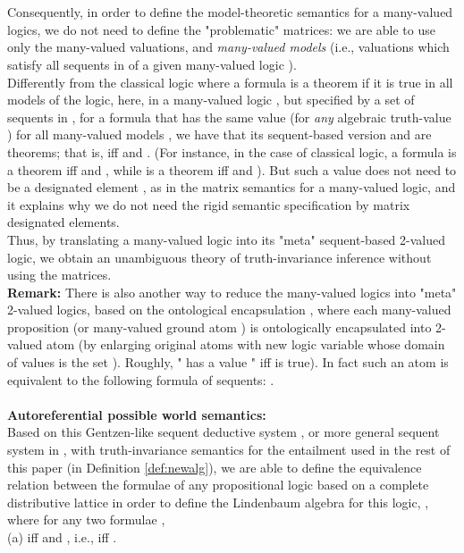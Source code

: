 \documentclass[10pt,twocolumn]{article}
\begin{document}
 \\\\
Consequently, in order to define the model-theoretic semantics for a
many-valued logics, we do not need to define the "problematic"
matrices: we are able to use only the many-valued valuations, and
\emph{many-valued models} (i.e., valuations which satisfy all
sequents in  of
a given many-valued logic ).\\
Differently from the classical logic where a formula is a theorem if
it is true in all models of the logic, here, in  a many-valued logic
, but specified by a set of sequents in , for a formula
 that has the same value  (for \emph{any}
algebraic truth-value ) for all many-valued models , we have that its sequent-based version  and  are theorems; that is,  iff  and . (For instance, in
the case of classical logic, a formula  is a theorem iff
 and , while  is a theorem iff  and ). But such a value
 does not need to be a designated element , as in
the matrix semantics for a many-valued logic, and it explains why we
do not need the rigid semantic specification by matrix designated
elements.\\ Thus, by  translating  a many-valued logic  into its
"meta" sequent-based 2-valued logic, we obtain an unambiguous theory
of truth-invariance inference without using the matrices.
\\
\textbf{Remark:} There is also another way to reduce the many-valued
logics into "meta" 2-valued logics, based on the ontological
encapsulation \cite{Majk04on}, where each many-valued proposition
(or many-valued ground atom ) is ontologically
encapsulated into 2-valued atom  (by enlarging
original atoms with new logic variable  whose domain of values is
the set ). Roughly, " has a value " iff
 is true).
 In fact such an atom is equivalent to the following formula of
 sequents:
 .
 \\\\
\textbf{Autoreferential possible world semantics:}\\
 Based on
this Gentzen-like sequent deductive system , or more general
sequent system in \cite{Majk09BS}, with truth-invariance semantics
for the entailment used in the rest of this paper (in Definition
\ref{def:newalg}), we are able to
 define the equivalence relation  between the formulae of any
 propositional logic based on a  complete distributive lattice   in order to
 define the Lindenbaum algebra for this logic, ,
 where for any two formulae ,\\ (a) iff  and , i.e., iff
  . \\
\end{document}

